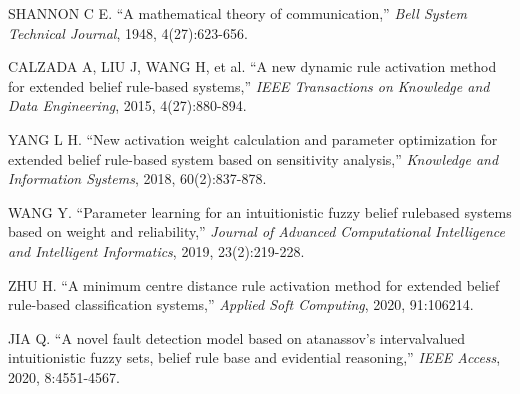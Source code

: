 \documentclass{ieeeaccess}
\begin{document}
\begin{thebibliography}{00}
     SHANNON C E. ``A mathematical theory of communication,''
    \emph{Bell System Technical Journal},
    1948, 4(27):623-656.

     CALZADA A, LIU J, WANG H, et al. ``A new dynamic rule activation
    method for extended belief rule-based systems,''
    \emph{IEEE Transactions on Knowledge and Data Engineering},
    2015, 4(27):880-894.

     YANG L H. ``New activation weight calculation and parameter optimization
    for extended belief rule-based system based on sensitivity analysis,''
    \emph{Knowledge and Information Systems},
    2018, 60(2):837-878.

     WANG Y. ``Parameter learning for an intuitionistic fuzzy belief rulebased
    systems based on weight and reliability,''
    \emph{Journal of Advanced Computational Intelligence and Intelligent Informatics},
    2019, 23(2):219-228.

     ZHU H. ``A minimum centre distance rule activation method for extended
    belief rule-based classification systems,''
    \emph{Applied Soft Computing},
    2020, 91:106214.

     JIA Q. ``A novel fault detection model based on atanassov’s intervalvalued
    intuitionistic fuzzy sets, belief rule base and evidential reasoning,''
    \emph{IEEE Access}, 2020, 8:4551-4567.


\end{thebibliography}
\end{document}
